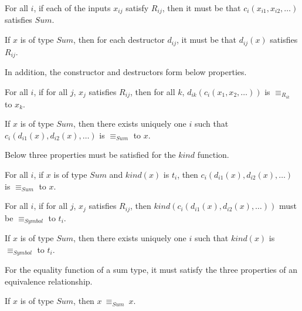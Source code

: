 \begin{property}
  For all $i$, if each of the inputs $x_{ij}$ satisfy $R_{ij}$, then
  it must be that $c_i(x_{i1}, x_{i2}, \ldots)$ satisfies $Sum$.
\end{property}

\begin{property}
  If $x$ is of type $Sum$, then for each destructor $d_{ij}$, it must be that
  $d_{ij}(x)$ satisfies $R_{ij}$.
\end{property}

\noindent In addition, the constructor and destructors form below properties.

\begin{property}
  For all $i$, if for all $j$, $x_j$ satisfies $R_{ij}$, then for all $k$,
  $d_{ik}(c_i(x_1, x_2, \ldots))$ is $\equiv_{R_{ik}}$ to $x_k$.
\end{property}

\begin{property}
  If $x$ is of type $Sum$, then there exists uniquely one $i$ such that
  $c_i(d_{i1}(x), d_{i2}(x), \ldots)$ is $\equiv_{Sum}$ to $x$.
\end{property}

\noindent Below three properties must be satisfied for the $kind$ function.
\begin{property}
  For all $i$, if $x$ is of type $Sum$ and $kind(x)$ is $t_i$, then
  $c_i(d_{i1}(x), d_{i2}(x), \ldots)$ is $\equiv_{Sum}$ to $x$.
\end{property}

\begin{property}
  For all $i$, if for all $j$, $x_j$ satisfies $R_{ij}$, then
  $kind(c_i(d_{i1}(x), d_{i2}(x), \ldots))$ must be $\equiv_{Symbol}$ to $t_{i}$.
\end{property}

\begin{property}
  If $x$ is of type $Sum$, then there exists uniquely one $i$ such that
  $kind(x)$ is $\equiv_{Symbol}$ to $t_i$.
\end{property}

\noindent For the equality function of a sum type, it must satisfy the three
properties of an equivalence relationship.

\begin{property}
  If $x$ is of type $Sum$, then $x\: \equiv_{Sum}\: x$.
\end{property}

